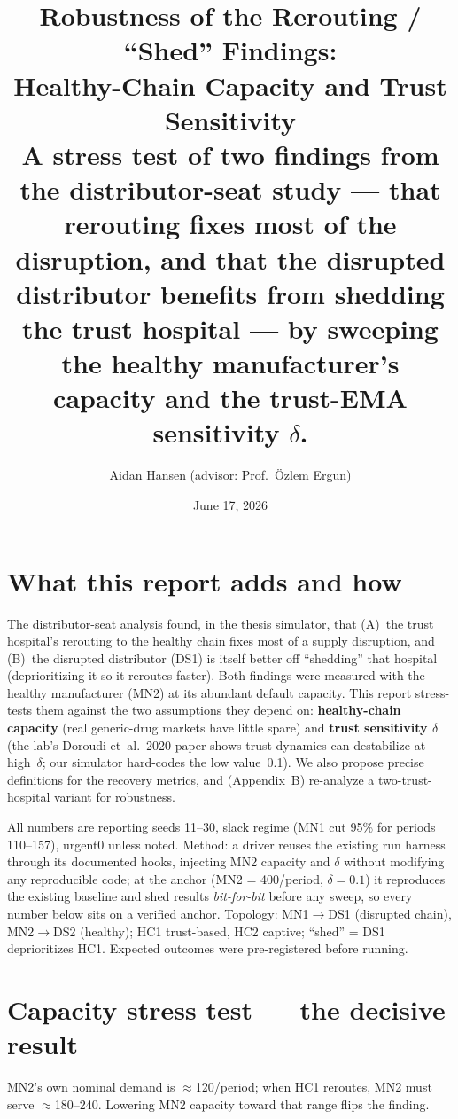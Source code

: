 \documentclass[11pt]{article}
\title{\textbf{Robustness of the Rerouting / ``Shed'' Findings:\\
Healthy-Chain Capacity and Trust Sensitivity}\\
\normalsize A stress test of two findings from the distributor-seat study --- that rerouting
fixes most of the disruption, and that the disrupted distributor benefits from shedding the
trust hospital --- by sweeping the healthy manufacturer's capacity and the trust-EMA
sensitivity $\delta$.}
\author{Aidan Hansen \quad (advisor: Prof.\ \"Ozlem Ergun)}
\date{June 17, 2026}
\begin{document}
\maketitle

\section*{What this report adds and how}

The distributor-seat analysis found, in the thesis simulator, that (A)~the trust hospital's
rerouting to the healthy chain fixes most of a supply disruption, and (B)~the disrupted
distributor (DS1) is itself better off ``shedding'' that hospital (deprioritizing it so it
reroutes faster). Both findings were measured with the healthy manufacturer (MN2) at its
abundant default capacity. This report stress-tests them against the two assumptions they
depend on: \textbf{healthy-chain capacity} (real generic-drug markets have little spare) and
\textbf{trust sensitivity $\delta$} (the lab's Doroudi et~al.\ 2020 paper shows trust dynamics
can destabilize at high~$\delta$; our simulator hard-codes the low value~0.1). We also propose
precise definitions for the recovery metrics, and (Appendix~B) re-analyze a two-trust-hospital
variant for robustness.

All numbers are reporting seeds 11--30, slack regime (MN1 cut 95\% for periods 110--157),
urgent0 unless noted. Method: a driver reuses the existing run harness through its
documented hooks, injecting MN2 capacity and $\delta$ without modifying any reproducible code;
at the anchor (MN2 = 400/period, $\delta=0.1$) it reproduces the existing baseline and shed
results \emph{bit-for-bit} before any sweep, so every number below sits on a verified anchor.
Topology: MN1$\to$DS1 (disrupted chain), MN2$\to$DS2 (healthy); HC1 trust-based, HC2 captive;
``shed'' = DS1 deprioritizes HC1. Expected outcomes were pre-registered before running.

\section{Capacity stress test --- the decisive result}

MN2's own nominal demand is $\approx$120/period; when HC1 reroutes, MN2 must serve
$\approx$180--240. Lowering MN2 capacity toward that range flips the finding.
\end{document}
